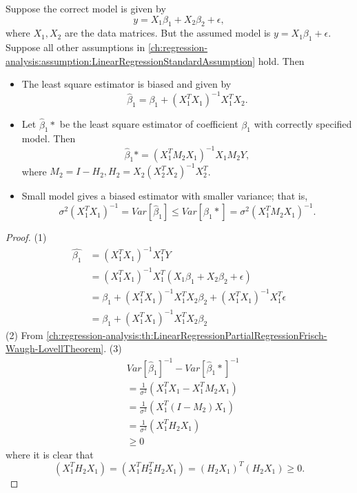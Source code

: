 \begin{refsection}
\begin{lemma}
Suppose the correct model is given by
$$y = X_1\beta_1 + X_2\beta_2 + \epsilon,$$
where $X_1,X_2$ are the data matrices.
But the assumed model is $y = X_1\beta_1 + \epsilon$. 
Suppose all other assumptions in \autoref{ch:regression-analysis:assumption:LinearRegressionStandardAssumption} hold.
Then
\begin{itemize}
	\item The least square estimator is biased and given by$$\hat{\beta}_1 = \beta_1 +(X_1^TX_1)^{-1}X_1^TX_2.$$
	\item Let $\hat{\beta}_1*$ be the least square estimator of coefficient $\beta_1$ with correctly specified model. Then 
	 $$\hat{\beta}_1* = (X_1^TM_2X_1)^{-1}X_1M_2Y,$$
	where $M_2 = I - H_2, H_2 = X_2(X_2^TX_2)^{-1}X_2^T$.
	\item Small model gives a biased estimator with smaller variance; that is,
	$$\sigma^2(X_1^TX_1)^{-1} = Var[\hat{\beta}_1] \leq Var[\hat{\beta}_1*] = \sigma^2(X_1^TM_2X_1)^{-1}.$$
\end{itemize}	
\end{lemma}
\begin{proof}
(1)	
\begin{align*}
\hat{\beta_1} &= (X_1^TX_1)^{-1}X_1^TY \\
              &= (X_1^TX_1)^{-1}X_1^T(X_1\beta_1 + X_2\beta_2 + \epsilon) \\
              &= \beta_1 + (X_1^TX_1)^{-1}X_1^TX_2\beta_2 + (X_1^TX_1)^{-1}X_1^T\epsilon \\
              &= \beta_1 + (X_1^TX_1)^{-1}X_1^TX_2\beta_2
\end{align*}	
(2) From \autoref{ch:regression-analysis:th:LinearRegressionPartialRegressionFrisch-Waugh-LovellTheorem}.
(3) 
\begin{align*}
& Var[\hat{\beta}_1]^{-1} - Var[\hat{\beta}_1*]^{-1} \\
& = \frac{1}{\sigma^2}(X_1^TX_1 - X_1^TM_2X_1) \\
& = \frac{1}{\sigma^2}(X_1^T(I-M_2)X_1) \\
& = \frac{1}{\sigma^2}(X_1^TH_2X_1) \\
& \geq 0
\end{align*}
where it is clear that $$(X_1^TH_2X_1) = (X_1^TH_2^TH_2X_1) = (H_2X_1)^T(H_2X_1)\geq 0.$$
\end{proof}


\begin{example}
	

\end{example}
\end{refsection}

